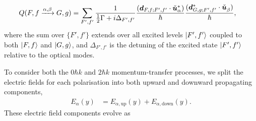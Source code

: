 \begin{align}
    Q(F, f \xrightarrow{\alpha, \beta} G, g) &= \sum_{F',f'}\frac{1}{\frac{1}{2}\Gamma + i \Delta_{F',f'}} \frac{(\bm{d}_{F, f; F', f'} \cdot \check{\bm{u}}_\alpha^*)}{\hbar} \frac{(\bm{d}_{G, g; F', f'}^* \cdot \check{\bm{u}}_\beta^{\phantom{*}})}{\hbar},
\end{align}
where the sum over $\{F', f'\}$ extends over all excited levels ${\left|F', f'\right>}$ coupled to both ${\left|F, f\right>}$ and ${\left|G, g\right>}$, and $\Delta_{F', f'}$ is the detuning of the excited state ${\left|F', f'\right>}$ relative to the optical modes.

To consider both the $0 \hbar k$ and $2 \hbar k$ momentum-transfer processes, we split the electric fields for each polarisation into both upward and downward propagating components,
\begin{align}
    E_{\alpha}(y) &= E_{\alpha, \text{up}}(y) + E_{\alpha, \text{down}}(y).
\end{align}
These electric field components evolve as
